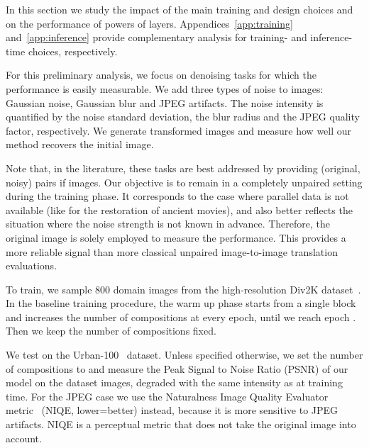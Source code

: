 \documentclass[a4paper,10pt]{extarticle}
\makeatletter
\renewcommand{\paragraph}{\@startsection{paragraph}{4}{\z@}{0em}{-0.5em}{\normalfont\normalsize\bfseries}}
\makeatother
\begin{document}
\newcommand{\stdminus}[1]{ \scalebox{0.8}{}}

In this section we study the impact of the main training and design choices and on the performance of powers of layers. 
Appendices~\ref{app:training} and~\ref{app:inference} provide complementary analysis for training- and inference-time choices, respectively. 

For this preliminary analysis, we focus on denoising tasks for which the performance is easily measurable. We add three types of noise to images: 
Gaussian noise, Gaussian blur and JPEG artifacts. 
The noise intensity is quantified by the noise standard deviation, the blur radius and the JPEG quality factor, respectively. 
We generate transformed images and measure how well our method recovers the initial image. 


Note that, in the literature, these tasks are best addressed by providing  (original, noisy) pairs if images. 
Our objective is to remain in a completely unpaired setting during the training phase. 
It corresponds to the case where parallel data is not available (like for the restoration of ancient movies), and also better reflects the situation where the noise strength is not known in advance. 
Therefore, the original image is solely employed to measure the performance.
This provides a more reliable signal than more classical unpaired image-to-image translation evaluations. 
\newcommand{\maxcomp}{n_\mathrm{tr}}
\newcommand{\maxcomptest}{n_\mathrm{te}}


\paragraph{Experimental protocol.}
To train, we sample 800 domain  images from the high-resolution Div2K dataset~\cite{Agustsson_2017_CVPR_Workshops}. 
In the baseline training procedure, the warm up phase starts from a single block and increases the number of compositions at every epoch, until we reach epoch . Then we keep the number of compositions fixed. 

We test on the Urban-100~\cite{Huang2015Urban100} dataset.
Unless specified otherwise, we set the number of compositions to  and
measure the Peak Signal to Noise Ratio (PSNR) of our model on the dataset images, degraded with the same intensity as at training time.
For the JPEG case we use the  Naturalness Image Quality Evaluator metric~\cite{Mittal2013NIQE} (NIQE, lower=better) instead, because it is more sensitive to JPEG artifacts.
NIQE is a perceptual metric that does not take the original image into account. 
\end{document}
